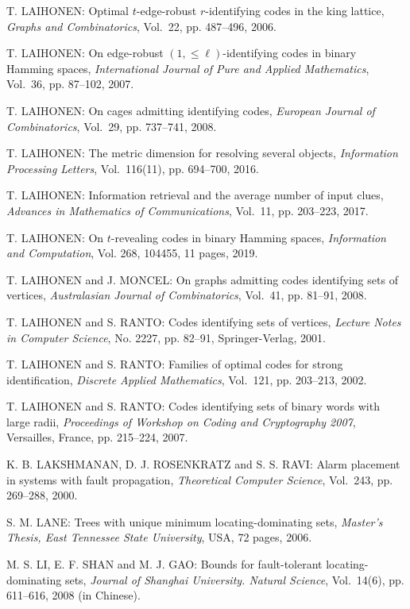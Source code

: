 \begin{thebibliography}{999}
T. LAIHONEN: Optimal $t$-edge-robust $r$-identifying codes in the king lattice, {\it Graphs and Combinatorics}, Vol.~22, pp. 487--496, 2006.

T. LAIHONEN: On edge-robust $(1,\leq\ell)$-identifying codes in binary Hamming spaces, {\it International Journal of Pure and Applied Mathematics}, Vol.~36, pp. 87--102, 2007.

T. LAIHONEN: On cages admitting identifying codes, {\it European Journal of Combinatorics}, Vol.~29, pp. 737--741, 2008.

T. LAIHONEN: The metric dimension for resolving several objects, {\it Information Processing Letters}, Vol.~116(11), pp. 694--700, 2016.

T. LAIHONEN: Information retrieval and the average number of input clues, {\it Advances in Mathematics of Communications}, Vol.~11, pp. 203--223, 2017.

T. LAIHONEN: On $t$-revealing codes in binary Hamming spaces, {\it Information and Computation}, Vol. 268, 104455, 11 pages, 2019.

T. LAIHONEN and J. MONCEL: On graphs admitting codes identifying sets of vertices, {\it Australasian Journal of Combinatorics}, Vol.~41, pp. 81--91, 2008.

T. LAIHONEN and S. RANTO: Codes identifying sets of vertices, {\it Lecture Notes in Computer Science}, No. 2227, pp. 82--91, Springer-Verlag, 2001.

T. LAIHONEN and S. RANTO: Families of optimal codes for strong identification, {\it Discrete Applied Mathematics}, Vol.~121, pp. 203--213, 2002.

T. LAIHONEN and S. RANTO: Codes identifying sets of binary words with large radii, {\it Proceedings of Workshop on Coding and Cryptography 2007}, Versailles, France, pp. 215--224, 2007.

K. B. LAKSHMANAN, D. J. ROSENKRATZ and S. S. RAVI: Alarm placement in systems with fault propagation, {\it Theoretical Computer Science}, Vol.~243, pp. 269--288, 2000.

S. M. LANE: Trees with unique minimum locating-dominating sets, {\it Master's Thesis, East Tennessee State University}, USA, 72 pages, 2006.

M. S. LI, E. F. SHAN and M. J. GAO: Bounds for fault-tolerant locating-dominating sets, {\it Journal of Shanghai University. Natural Science}, Vol.~14(6), pp. 611--616, 2008 (in Chinese).


\end{thebibliography}
